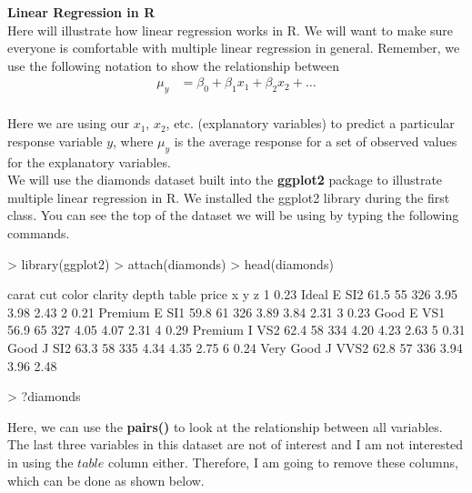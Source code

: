 \documentclass{article}
\begin{document}



\textbf{Linear Regression in R}\\[.25cm]

Here will illustrate how linear regression works in R.  We will want to make sure everyone is comfortable with  multiple linear regression in general.  Remember, we use the following notation to show the relationship between \\[.25cm]

\begin{eqnarray*}
\mu_y&=\beta_0 + \beta_1 x_1 + \beta_2 x_2 + \ldots\\
\end{eqnarray*}

Here we are using our $x_1$, $x_2$, etc. (explanatory variables) to predict a particular response variable $y$, where $\mu_y$ is the average response for a set of observed values for the explanatory variables.\\[.25cm]

We will use the diamonds dataset built into the \textbf{ggplot2} package to illustrate multiple linear regression in R.  We installed the ggplot2 library during the first class.  You can see the top of the dataset we will be using by typing the following commands.\\

\begin{Schunk}
\begin{Sinput}
> library(ggplot2)
> attach(diamonds)
> head(diamonds)
\end{Sinput}
\begin{Soutput}
  carat       cut color clarity depth table price    x    y    z
1  0.23     Ideal     E     SI2  61.5    55   326 3.95 3.98 2.43
2  0.21   Premium     E     SI1  59.8    61   326 3.89 3.84 2.31
3  0.23      Good     E     VS1  56.9    65   327 4.05 4.07 2.31
4  0.29   Premium     I     VS2  62.4    58   334 4.20 4.23 2.63
5  0.31      Good     J     SI2  63.3    58   335 4.34 4.35 2.75
6  0.24 Very Good     J    VVS2  62.8    57   336 3.94 3.96 2.48
\end{Soutput}
\begin{Sinput}
> ?diamonds
\end{Sinput}
\end{Schunk}

Here, we can use the \textbf{pairs()} to look at the relationship between all variables.  The last three variables in this dataset are not of interest and I am not interested in using the $table$ column either.  Therefore, I am going to remove these columns, which can be done as shown below.\\[.25cm]
\end{document}

